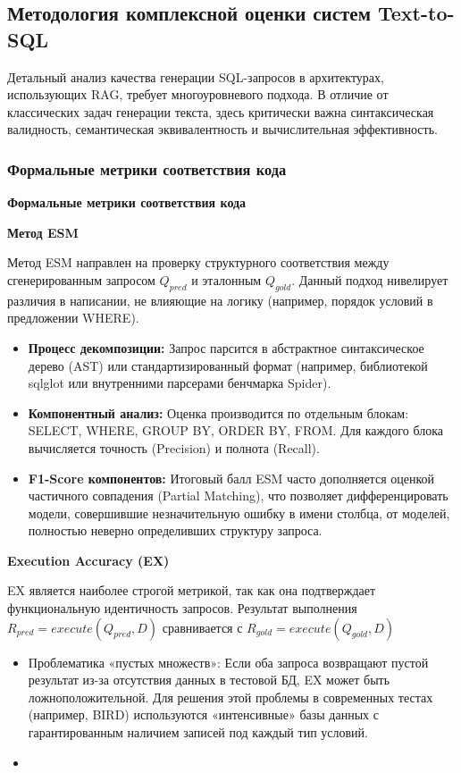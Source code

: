\subsection{Методология комплексной оценки систем Text-to-SQL}

Детальный анализ качества генерации SQL-запросов в архитектурах, использующих RAG, требует многоуровневого подхода. В отличие от классических задач генерации текста, здесь критически важна синтаксическая валидность, семантическая эквивалентность и вычислительная эффективность.

\subsubsection{Формальные метрики соответствия кода}

\textbf{Формальные метрики соответствия кода}

\textbf{Метод ESM}

Метод ESM направлен на проверку структурного соответствия между сгенерированным запросом $Q_{pred}$ и эталонным $Q_{gold}$. Данный подход нивелирует различия в написании, не влияющие на логику (например, порядок условий в предложении WHERE).

\begin{itemize}
    \item \textbf{Процесс декомпозиции:} Запрос парсится в абстрактное синтаксическое дерево (AST) или стандартизированный формат (например, библиотекой sqlglot или внутренними парсерами бенчмарка Spider). 
    \item \textbf{Компонентный анализ:} Оценка производится по отдельным блокам: SELECT, WHERE, GROUP BY, ORDER BY, FROM. Для каждого блока вычисляется точность (Precision) и полнота (Recall).
    \item \textbf{F1-Score компонентов:} Итоговый балл ESM часто дополняется оценкой частичного совпадения (Partial Matching), что позволяет дифференцировать модели, совершившие незначительную ошибку в имени столбца, от моделей, полностью неверно определивших структуру запроса.
\end{itemize}

\textbf{Execution Accuracy (EX)}

EX является наиболее строгой метрикой, так как она подтверждает функциональную идентичность запросов. Результат выполнения $R_{pred}=execute(Q_{pred}, D)$ сравнивается с $R_{gold}=execute(Q_{gold}, D)$

\begin{itemize}
    \item Проблематика «пустых множеств»: Если оба запроса возвращают пустой результат из-за отсутствия данных в тестовой БД, EX может быть ложноположительной. Для решения этой проблемы в современных тестах (например, BIRD) используются «интенсивные» базы данных с гарантированным наличием записей под каждый тип условий.
    \item 

\end{itemize}

